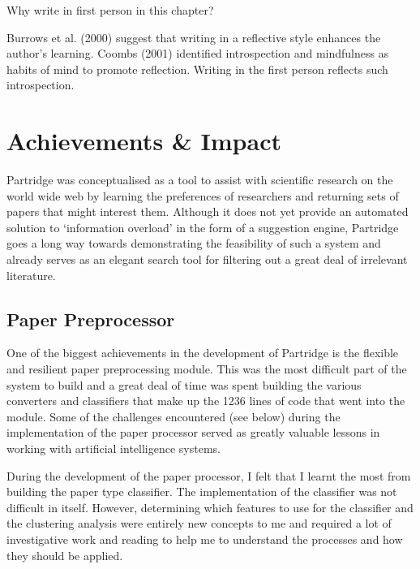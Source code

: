 %  
%

Why write in first person in this chapter?

Burrows et al. (2000) suggest that writing in a reflective style enhances the
author's learning\cite{JEE:JEE657}. Coombs (2001) identified introspection and
mindfulness as habits of mind to promote reflection. Writing in the first
person reflects such introspection\cite{coombs2001reflective}.

\section{ Achievements \& Impact}

Partridge was conceptualised as a tool to assist with scientific research on
the world wide web by learning the preferences of researchers and returning
sets of papers that might interest them. Although it does not yet provide an
automated solution to `information overload' in the form of a suggestion
engine, Partridge goes a long way towards demonstrating the feasibility of such
a system and already serves as an elegant search tool for filtering out a great
deal of irrelevant literature.

\subsection{ Paper Preprocessor}

One of the biggest achievements in the development of Partridge is the flexible
and resilient paper preprocessing module. This was the most difficult part of
the system to build and a great deal of time was spent building the various
converters and classifiers that make up the 1236 lines of code that went into
the module. Some of the challenges encountered (see below) during the
implementation of the paper processor served as greatly valuable lessons in
working with artificial intelligence systems. 

During the development of the paper processor, I felt that I learnt the most
from building the paper type classifier. The implementation of the classifier
was not difficult in itself. However, determining which features to use for the
classifier and the clustering analysis were entirely new concepts to me and
required a lot of investigative work and reading to help me to understand the
processes and how they should be applied.

